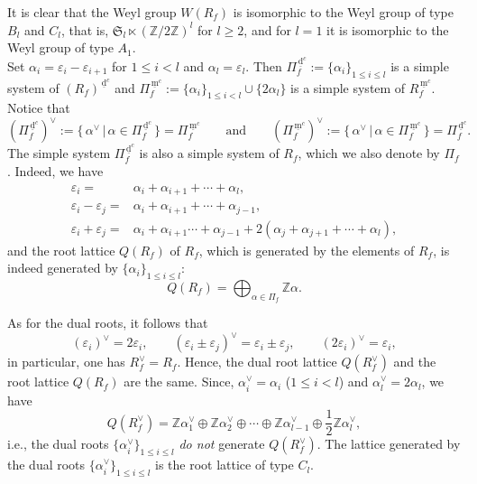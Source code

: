 \documentclass[11pt]{amsart}
\newcommand{\Z}{\mathbb{Z}}
\newcommand{\fS}{\mathfrak{S}}
\newcommand{\dc}{\,\underline{\mathrm{d}}^c}
\newcommand{\mc}{\, \underline{\mathrm{m}}^c}
\newcommand{\vep}{\varepsilon}
\begin{document}
It is clear that the Weyl group $W(R_f)$ is isomorphic to the Weyl group of type $B_l$ and $C_l$, that is, $\fS_l \ltimes (\Z/2\Z)^l$ for $l\geq 2$, and for $l=1$ it is isomorphic to the Weyl group of type $A_1$. \\

Set $\alpha_i=\vep_i-\vep_{i+1}$ for $1\leq i<l$ and $\alpha_l=\vep_l$. Then $\Pi_f^{\dc}:=\{\alpha_i\}_{1\leq i\leq l}$ is a simple system of $(R_f)^{\dc}$ and $\Pi_f^{\mc}:=\{\alpha_i\}_{1\leq i<l} \cup \{2\alpha_l\}$ is a simple system of $R_f^{\mc}$. Notice that 
\[ (\Pi_f^{\dc})^\vee:=\{\, \alpha^\vee\,\vert \, \alpha \in \Pi_f^{\dc}\, \}=\Pi_f^{\mc} \qquad  \text{and} \qquad  (\Pi_f^{\mc})^\vee:=\{ \, \alpha^\vee\, \vert\, \alpha \in \Pi_f^{\mc}\, \}=\Pi_f^{\dc}. 
\]
The simple system $\Pi_f^{\dc}$ is also a simple system of $R_f$, which we also denote by $\Pi_f$. 
Indeed, we have
\begin{align*}
\vep_i=
&\alpha_i+\alpha_{i+1}+\cdots+\alpha_l, \\
\vep_i-\vep_j=
&\alpha_i+\alpha_{i+1}+\cdots+\alpha_{j-1}, \\
\vep_i+\vep_j=
&\alpha_i+\alpha_{i+1}\cdots +\alpha_{j-1}+2(\alpha_j+\alpha_{j+1}+\cdots+\alpha_l), 
\end{align*}
and the root lattice $Q(R_f)$ of $R_f$, which is generated by the elements of $R_f$,  is indeed generated by $\{\alpha_i\}_{1\leq i\leq l}$:  
\[ Q(R_f)=\bigoplus_{\alpha \in \Pi_f} \Z \alpha. \]

As for the dual roots, it follows that
\[ (\vep_i)^\vee=2\vep_i, \qquad (\vep_i\pm \vep_j)^\vee=\vep_i\pm \vep_j, \qquad (2\vep_i)^\vee=\vep_i, \]
in particular, one has $R_f^\vee=R_f$. Hence, the dual root lattice $Q(R_f^\vee)$ and the root lattice $Q(R_f)$ are the same. Since, $\alpha_i^\vee=\alpha_i$ ($1\leq i<l$) and $\alpha_l^\vee=2\alpha_l$, we have
\[ Q(R_f^\vee) =\Z \alpha_1^\vee \oplus \Z \alpha_2^\vee \oplus \cdots \oplus \Z \alpha_{l-1}^\vee \oplus \frac{1}{2}\Z \alpha_l^\vee,
\]
i.e., the dual roots $\{\alpha_i^\vee\}_{1\leq i\leq l}$ \textit{do not} generate $Q(R_f^\vee)$. 
The lattice generated by the dual roots $\{\alpha_i^\vee\}_{1\leq i\leq l}$ is the root lattice of type $C_l$.
\medskip
\end{document}
